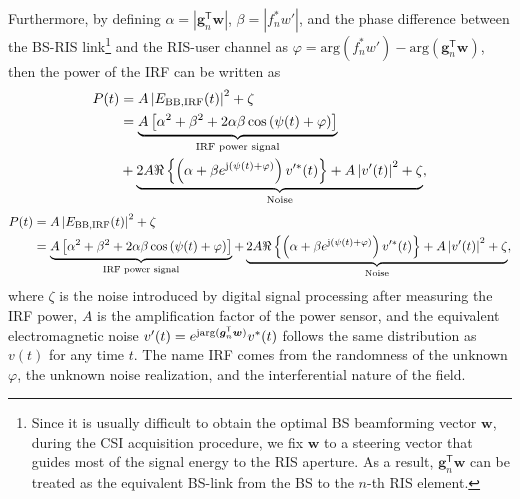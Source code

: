 \documentclass[journal,twocolumn]{IEEEtran}
\theoremstyle{nonumberplain}
\def \T {\bm \Theta}
\def \arg {\text{arg}}
\def \T {^{\mathsf{T}}}
\begin{document}
    Furthermore, by defining $\alpha = \left\vert\bm g_{n}\T\bm w\right\vert$, $\beta = \left\vert f_{n}^{*} w' \right\vert$, and the phase difference between the \ac{BS}-RIS link\footnote{Since it is usually difficult to obtain the optimal BS beamforming vector $\bm w$, during the CSI acquisition procedure, we fix $\bm w$ to a steering vector that guides most of the signal energy to the RIS aperture. As a result, $\bm g_n\T \bm w$ can be treated as the equivalent BS-link from the BS to the $n$-th RIS element.} and the RIS-user channel as $\varphi = \arg\left(f_{n}^{*}w'\right)-\arg\left(\bm g_{n}\T\bm w\right)$, then the power of the \ac{IRF} can be written as
    \ifx\onecol\undefined
        \begin{equation}
            \label{eqn:power of interference}
            \begin{aligned}
                P(t)&=A \left| E_{{\rm BB, IRF}} (t)\right |^{2}+\zeta\\
                &=\underbrace{A\left[\alpha^{2}+\beta^{2}+2\alpha\beta\cos\left(\psi(t)+\varphi\right)\right]}_{\text{IRF power signal}}\\
                &+\underbrace{2A\Re\left\{\left(\alpha+\beta e^{{\rm j}\left(\psi(t)+\varphi\right)}\right)v'^{*}(t)\right\}+A\left|v'(t)\right|^{2}+\zeta}_{\text{Noise}},\\
            \end{aligned}
        \end{equation}
    \else 
        \begin{equation}
            \label{eqn:power of interference}
            \begin{aligned}
                P(t)&=A \left| E_{{\rm BB, IRF}} (t)\right |^{2}+\zeta\\
                &=\underbrace{A\left[\alpha^{2}+\beta^{2}+2\alpha\beta\cos\left(\psi(t)+\varphi\right)\right]}_{\text{IRF power signal}}+\underbrace{2A\Re\left\{\left(\alpha+\beta e^{{\rm j}\left(\psi(t)+\varphi\right)}\right)v'^{*}(t)\right\}+A\left|v'(t)\right|^{2}+\zeta}_{\text{Noise}},\\
            \end{aligned}
        \end{equation}
    \fi
    where $\zeta$ is the noise introduced by digital signal processing after measuring the IRF power, $A$ is the amplification factor of the power sensor, and the equivalent electromagnetic noise $v'(t) = e^{{\rm j}{\rm arg}({\bm g}_n\T \bm w)}v^*(t)$ follows the same distribution as $v(t)$ for any time $t$.
    The name IRF comes from the randomness of the unknown $\varphi$, the unknown noise realization, and the interferential nature of the field.
\end{document}
